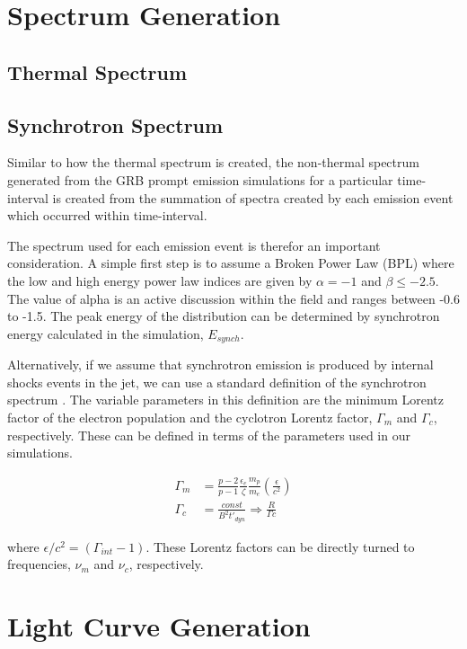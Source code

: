 \documentclass[linenumbers,twocolumn]{aastex631}
\begin{document}
\section{Spectrum Generation} \label{sec:spectrum}
\subsection{Thermal Spectrum}

\subsection{Synchrotron Spectrum}

Similar to how the thermal spectrum is created, the non-thermal spectrum generated from the GRB prompt emission simulations for a particular time-interval is created from the summation of spectra created by each emission event which occurred within time-interval.

The spectrum used for each emission event is therefor an important consideration. A simple first step is to assume a Broken Power Law (BPL) where the low and high energy power law indices are given by $\alpha=-1$ and $\beta\leq-2.5$. The value of alpha is an active discussion within the field and ranges between -0.6 to -1.5. The peak energy of the distribution can be determined by synchrotron energy calculated in the simulation, $E_{synch}$.

Alternatively, if we assume that synchrotron emission is produced by internal shocks events in the jet, we can use a standard definition of the synchrotron spectrum \citep{1998ApJ...497L..17S}. The variable parameters in this definition are the minimum Lorentz factor of the electron population and the cyclotron Lorentz factor, $\Gamma_m$ and $\Gamma_c$, respectively. These can be defined in terms of the parameters used in our simulations.

\begin{align}
	\Gamma_m &= \frac{p-2}{p-1} \frac{\epsilon_e}{\zeta} \frac{m_p}{m_e} \left(\frac{\epsilon}{c^2}\right) \\
	\Gamma_c &= \frac{const}{B^2 t'_{dyn}} \Rightarrow \frac{R}{\Gamma c}
\end{align}

where $\epsilon/c^2 = (\Gamma_{int} -1)$. These Lorentz factors can be directly turned to frequencies, $\nu_m$ and $\nu_c$, respectively. 


\section{Light Curve Generation} \label{sec:light curve}
\end{document}
